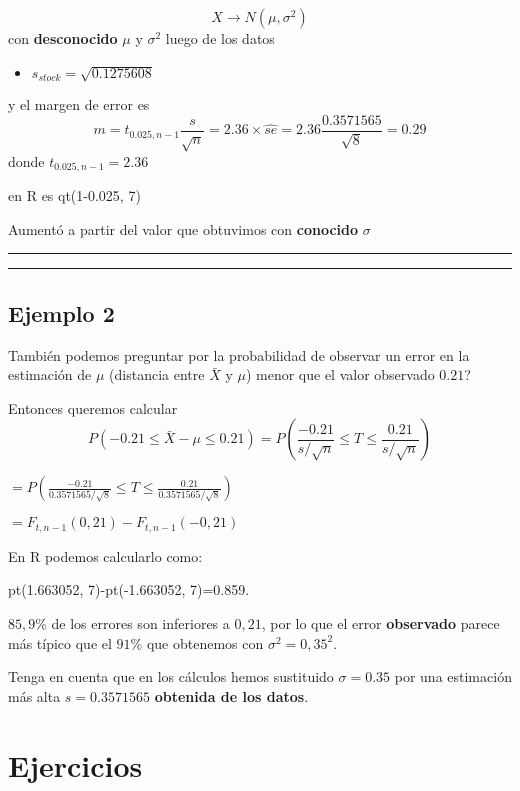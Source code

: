 \documentclass[
]{book}
\providecommand{\tightlist}{%
  \setlength{\itemsep}{0pt}\setlength{\parskip}{0pt}}
\begin{document}
\[X \rightarrow N(\mu, \sigma^2)\]
con \textbf{desconocido} \(\mu\) y \(\sigma^2\) luego de los datos

\begin{itemize}
\tightlist
\item
  \(s_{stock}=\sqrt{0.1275608}\)
\end{itemize}

y el margen de error es \[m=t_{0.025, n-1} \frac{s}{\sqrt{n}}=2.36\times \hat{se}=2.36\frac{0.3571565}{\sqrt{ 8}}=0.29\]
donde \(t_{0.025, n-1}=2.36\)

en R es qt(1-0.025, 7)

Aumentó a partir del valor que obtuvimos con \textbf{conocido} \(\sigma\)

\begin{center}\rule{0.5\linewidth}{0.5pt}\end{center}

\begin{center}\rule{0.5\linewidth}{0.5pt}\end{center}

\hypertarget{ejemplo-2-2}{%
\section{Ejemplo 2}\label{ejemplo-2-2}}

También podemos preguntar por la probabilidad de observar un error en la estimación de \(\mu\) (distancia entre \(\bar{X}\) y \(\mu\)) menor que el valor observado \(0.21\)?

Entonces queremos calcular \[P(-0.21 \leq \bar{X} - \mu\leq 0.21)=P(\frac{-0.21}{s/\sqrt{n}} \leq T \leq \frac {0.21}{s/\sqrt{n}})\]

\(=P(\frac{-0.21}{0.3571565/\sqrt{8}} \leq T \leq \frac{0.21}{0.3571565/\sqrt{8}})\)

\(=F_{t, n-1}(0,21)-F_{t, n-1}(-0,21)\)

En R podemos calcularlo como:

pt(1.663052, 7)-pt(-1.663052, 7)=0.859.

\(85,9\%\) de los errores son inferiores a \(0,21\), por lo que el error \textbf{observado} parece más típico que el \(91\%\) que obtenemos con \(\sigma^2=0,35^2\).

Tenga en cuenta que en los cálculos hemos sustituido \(\sigma=0.35\) por una estimación más alta \(s=0.3571565\) \textbf{obtenida de los datos}.

\hypertarget{ejercicios}{%
\chapter{Ejercicios}\label{ejercicios}}
\end{document}

